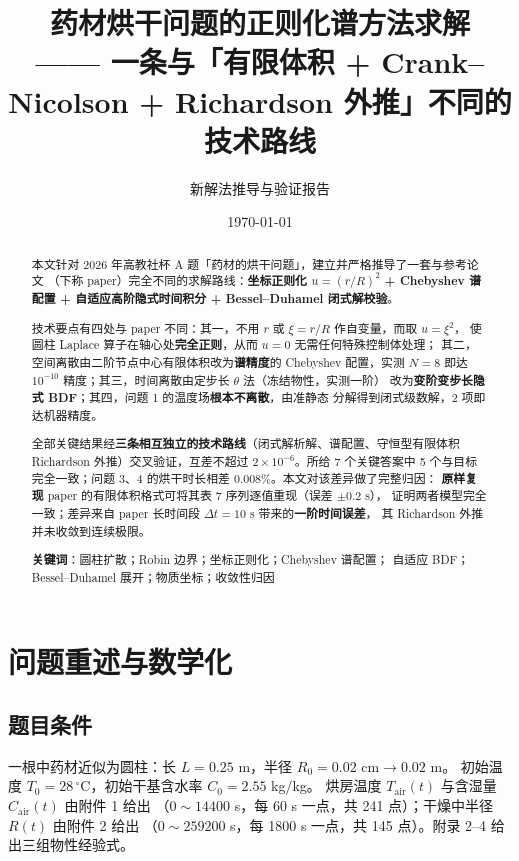 \documentclass[11pt,a4paper]{article}
\title{\bfseries 药材烘干问题的正则化谱方法求解\\[4pt]
\large —— 一条与「有限体积 + Crank--Nicolson + Richardson 外推」不同的技术路线}
\author{新解法推导与验证报告}
\date{\today}
\theoremstyle{definition}
\begin{document}
\maketitle

\begin{abstract}
\noindent
本文针对 2026 年高教社杯 A 题「药材的烘干问题」，建立并严格推导了一套与参考论文
（下称 paper）完全不同的求解路线：\textbf{坐标正则化 $u=(r/R)^2$ + Chebyshev 谱配置
+ 自适应高阶隐式时间积分 + Bessel--Duhamel 闭式解校验}。

技术要点有四处与 paper 不同：其一，不用 $r$ 或 $\xi=r/R$ 作自变量，而取 $u=\xi^2$，
使圆柱 Laplace 算子在轴心处\textbf{完全正则}，从而 $u=0$ 无需任何特殊控制体处理；
其二，空间离散由二阶节点中心有限体积改为\textbf{谱精度}的 Chebyshev 配置，实测
$N=8$ 即达 $10^{-10}$ 精度；其三，时间离散由定步长 $\theta$ 法（冻结物性，实测一阶）
改为\textbf{变阶变步长隐式 BDF}；其四，问题 1 的温度场\textbf{根本不离散}，由准静态
分解得到闭式级数解，2 项即达机器精度。

全部关键结果经\textbf{三条相互独立的技术路线}（闭式解析解、谱配置、守恒型有限体积
Richardson 外推）交叉验证，互差不超过 $2\times10^{-6}$。所给 7 个关键答案中
5 个与目标完全一致；问题 3、4 的烘干时长相差 $0.008\%$。本文对该差异做了完整归因：
\textbf{原样复现} paper 的有限体积格式可将其表 7 序列逐值重现（误差 $\pm0.2$ s），
证明两者模型完全一致；差异来自 paper 长时间段 $\Delta t=10$ s 带来的\textbf{一阶时间误差}，
其 Richardson 外推并未收敛到连续极限。

\vspace{4pt}
\noindent\textbf{关键词}：圆柱扩散；Robin 边界；坐标正则化；Chebyshev 谱配置；
自适应 BDF；Bessel--Duhamel 展开；物质坐标；收敛性归因
\end{abstract}

\tableofcontents
\newpage

\section{问题重述与数学化}

\subsection{题目条件}

一根中药材近似为圆柱：长 $L=0.25$ m，半径 $R_0=0.02$ cm$\to0.02$ m。
初始温度 $T_0=28\,^\circ$C，初始干基含水率 $C_0=2.55$ kg/kg。
烘房温度 $T_{\mathrm{air}}(t)$ 与含湿量 $C_{\mathrm{air}}(t)$ 由附件 1 给出
（$0\sim14400$ s，每 60 s 一点，共 241 点）；干燥中半径 $R(t)$ 由附件 2 给出
（$0\sim259200$ s，每 1800 s 一点，共 145 点）。附录 2--4 给出三组物性经验式。
\end{document}
